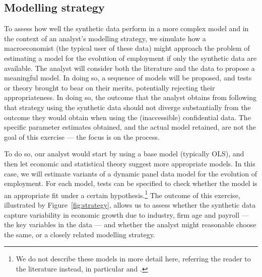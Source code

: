 \documentclass[10pt,twoside]{article}
\begin{document}
\subsection{Modelling strategy}

To assess how well the synthetic data perform in a more complex model and in the context of an analyst's modelling strategy, we simulate how a macroeconomist (the typical user of these data) might approach the problem of estimating a model for the evolution of employment if only the synthetic data are available. The analyst will consider both the literature and the data to propose a meaningful model. In doing so, a sequence of models will be proposed, and tests or theory brought to bear on their merits, potentially rejecting their appropriateness. In doing so, the outcome that the analyst obtains from following that strategy using the synthetic data should not diverge substantially from the outcome they would obtain when using the (inaccessible) confidential data. The specific parameter estimates obtained, and the actual model retained, are not the goal of this exercise --- the focus is on the process.

To do so, our analyst would start by using a base model (typically OLS), and then let economic and statistical theory suggest more appropriate models. In this case, we will estimate variants of a dynamic panel data model for the evolution of employment. For each model, tests can be specified to check whether the model is an appropriate fit under a certain hypothesis.\footnote{We do not describe these models in more detail here, referring the reader to the literature instead, in particular \textcite{RePEc:eee:econom:v:68:y:1995:i:1:p:29-51} and \textcite{RePEc:eee:econom:v:87:y:1998:i:1:p:115-143}.} The outcome of this exercise, illustrated by Figure~\ref{fig:strategy}, allows us to assess whether the synthetic data capture variability in economic growth due to industry, firm age and payroll --- the key variables in the data --- and whether the analyst might reasonable choose the same, or a closely related modelling strategy.
\end{document}
